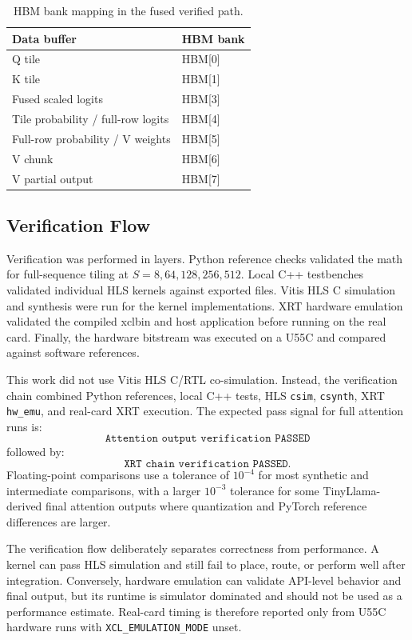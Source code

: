 \documentclass[conference]{IMSTemplate}
\begin{document}
\begin{table}[t]
\centering
\caption{HBM bank mapping in the fused verified path.}
\label{tab:hbm}
\begin{tabular}{ll}
\toprule
Data buffer & HBM bank \\
\midrule
Q tile & HBM[0] \\
K tile & HBM[1] \\
Fused scaled logits & HBM[3] \\
Tile probability / full-row logits & HBM[4] \\
Full-row probability / V weights & HBM[5] \\
V chunk & HBM[6] \\
V partial output & HBM[7] \\
\bottomrule
\end{tabular}
\end{table}

\subsection{Verification Flow}

Verification was performed in layers. Python reference checks validated the
math for full-sequence tiling at \(S=8,64,128,256,512\). Local C++ testbenches
validated individual HLS kernels against exported files. Vitis HLS C simulation
and synthesis were run for the kernel implementations. XRT hardware emulation
validated the compiled xclbin and host application before running on the real
card. Finally, the hardware bitstream was executed on a U55C and compared
against software references.

This work did not use Vitis HLS C/RTL co-simulation. Instead, the verification
chain combined Python references, local C++ tests, HLS \texttt{csim},
\texttt{csynth}, XRT \texttt{hw\_emu}, and real-card XRT execution. The
expected pass signal for full attention runs is:
\[
\texttt{Attention output verification PASSED}
\]
followed by:
\[
\texttt{XRT chain verification PASSED}.
\]
Floating-point comparisons use a tolerance of \(10^{-4}\) for most synthetic
and intermediate comparisons, with a larger \(10^{-3}\) tolerance for some
TinyLlama-derived final attention outputs where quantization and PyTorch
reference differences are larger.

The verification flow deliberately separates correctness from performance. A
kernel can pass HLS simulation and still fail to place, route, or perform well
after integration. Conversely, hardware emulation can validate API-level
behavior and final output, but its runtime is simulator dominated and should not
be used as a performance estimate. Real-card timing is therefore reported only
from U55C hardware runs with \texttt{XCL\_EMULATION\_MODE} unset.
\end{document}

